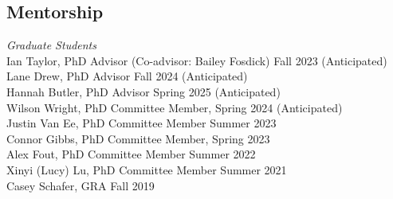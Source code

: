 \documentclass[margin,line]{res}
\begin{document}
\begin{resume}
% 
% 

% 

\section{\sc Mentorship}

{\em Graduate Students} \hfill \\
Ian Taylor, PhD Advisor (Co-advisor: Bailey Fosdick) \hfill Fall 2023 (Anticipated) \\
Lane Drew, PhD Advisor \hfill Fall 2024 (Anticipated) \\
Hannah Butler, PhD Advisor \hfill Spring 2025 (Anticipated) \\
Wilson Wright, PhD Committee Member, \hfill Spring 2024 (Anticipated) \\
Justin Van Ee, PhD Committee Member \hfill Summer 2023 \\
Connor Gibbs, PhD Committee Member, \hfill Spring 2023  \\
Alex Fout, PhD Committee Member \hfill Summer 2022 \\
Xinyi (Lucy) Lu, PhD Committee Member \hfill Summer 2021 \\
Casey Schafer, GRA \hfill Fall 2019 \\





\end{resume}
\end{document}
